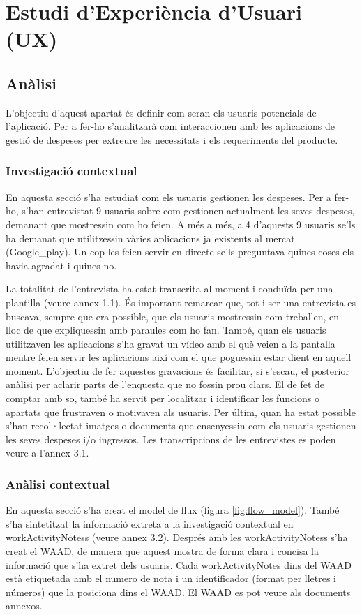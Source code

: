 \chapter{Estudi d'Experiència d'Usuari (UX)}

\section{Anàlisi}
L'objectiu d'aquest apartat és definir com seran els usuaris potencials de l'aplicació. Per a fer-ho s'analitzarà com interaccionen amb les aplicacions de gestió de despeses per extreure les necessitats i els requeriments del producte.

\subsection{Investigació contextual}
En aquesta secció s'ha estudiat com els usuaris gestionen les despeses. Per a fer-ho, s'han entrevistat 9 usuaris sobre com gestionen actualment les seves despeses, demanant que mostressin com ho feien. A més a més, a 4 d'aquests 9 usuaris se'ls ha demanat que utilitzessin vàries aplicacions ja existents al mercat (\gls{Google_play}). Un cop les feien servir en directe se'ls preguntava quines coses els havia agradat i quines no. 

La totalitat de l'entrevista ha estat transcrita al moment i conduïda per una plantilla (veure annex 1.1). És important remarcar que, tot i ser una entrevista es buscava, sempre que era possible, que els usuaris mostressin com treballen, en lloc de que expliquessin amb paraules com ho fan. També, quan els usuaris utilitzaven les aplicacions s'ha gravat un vídeo amb el què veien a la pantalla mentre feien servir les aplicacions així com el que poguessin estar dient en aquell moment. L'objectiu de fer aquestes gravacions és facilitar, si s'escau, el posterior anàlisi per aclarir parts de l'enquesta que no fossin prou clars. El de fet de comptar amb so, també ha servit per localitzar i identificar les funcions o apartats que frustraven o motivaven als usuaris. Per últim, quan ha estat possible s'han recol·lectat imatges o documents que ensenyessin com els usuaris gestionen les seves despeses i/o ingressos. Les transcripcions de les entrevistes es poden veure a l'annex 3.1.


\subsection{Anàlisi contextual}
En aquesta secció s'ha creat el model de flux (figura \ref{fig:flow_model}). També s'ha sintetitzat la informació extreta a la investigació contextual en \glspl{workActivityNotes} (veure annex 3.2). Després amb les \glspl{workActivityNotes} s'ha creat el \ac{WAAD}, de manera que aquest mostra de forma clara i concisa la informació que s'ha extret dels usuaris. Cada \gls{workActivityNotes} dins del \ac{WAAD} està etiquetada amb el numero de nota i un identificador (format per lletres i números) que la posiciona dins el \ac{WAAD}. El \ac{WAAD} es pot veure als documents annexos. 

